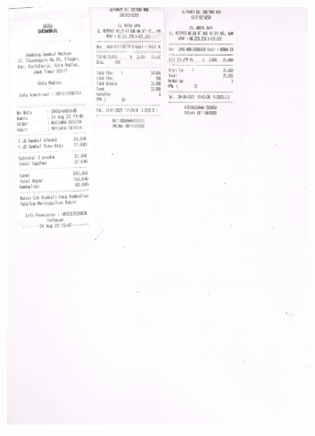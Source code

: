 \documentclass{article} %
\begin{document}
	\begin{figure}[H]
		\centering
		\includegraphics[width=0.8\textwidth]{images/konsum}
	\end{figure}
\end{document}
